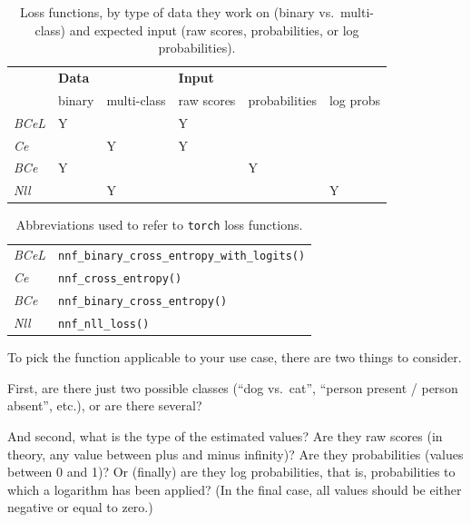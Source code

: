 \documentclass[
  letterpaper,
]{krantz}
\begin{document}
\hypertarget{tbl-loss-funcs-features}{}
\begin{longtable}[]{@{}
  >{\raggedright\arraybackslash}p{}
  >{\raggedright\arraybackslash}p{}
  >{\raggedright\arraybackslash}p{}
  >{\raggedright\arraybackslash}p{}
  >{\raggedright\arraybackslash}p{}
  >{\raggedright\arraybackslash}p{}@{}}
\caption{\label{tbl-loss-funcs-features}Loss functions, by type of data
they work on (binary vs.~multi-class) and expected input (raw scores,
probabilities, or log probabilities).}\tabularnewline
\toprule\noalign{}
\endfirsthead
\endhead
\bottomrule\noalign{}
\endlastfoot
& \textbf{Data} & & \textbf{Input} & & \\
& binary & multi-class & raw scores & probabilities & log probs \\
\emph{BCeL} & Y & & Y & & \\
\emph{Ce} & & Y & Y & & \\
\emph{BCe} & Y & & & Y & \\
\emph{Nll} & & Y & & & Y \\
\end{longtable}

\hypertarget{tbl-loss-abbrevs}{}
\begin{longtable}[]{@{}ll@{}}
\caption{\label{tbl-loss-abbrevs}Abbreviations used to refer to
\texttt{torch} loss functions.}\tabularnewline
\toprule\noalign{}
\endfirsthead
\endhead
\bottomrule\noalign{}
\endlastfoot
\emph{BCeL} & \texttt{nnf\_binary\_cross\_entropy\_with\_logits()} \\
\emph{Ce} & \texttt{nnf\_cross\_entropy()} \\
\emph{BCe} & \texttt{nnf\_binary\_cross\_entropy()} \\
\emph{Nll} & \texttt{nnf\_nll\_loss()} \\
\end{longtable}

To pick the function applicable to your use case, there are two things
to consider.

First, are there just two possible classes (``dog vs.~cat'', ``person
present / person absent'', etc.), or are there several?

And second, what is the type of the estimated values? Are they raw
scores (in theory, any value between plus and minus infinity)? Are they
probabilities (values between 0 and 1)? Or (finally) are they log
probabilities, that is, probabilities to which a logarithm has been
applied? (In the final case, all values should be either negative or
equal to zero.)
\end{document}
